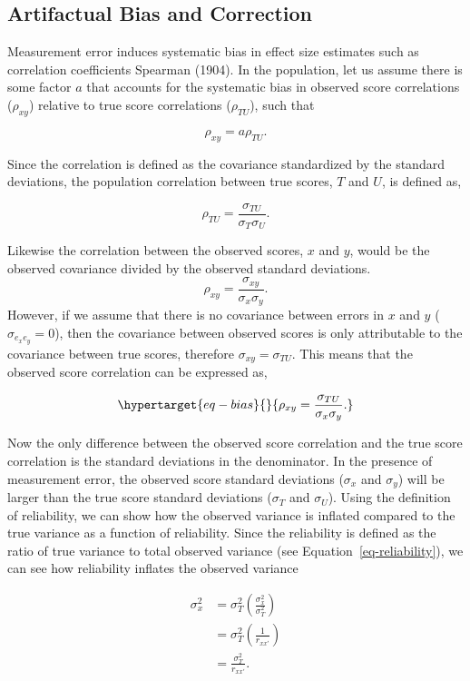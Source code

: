 \documentclass[
  letterpaper,
  DIV=11,
  numbers=noendperiod]{scrreprt}
\begin{document}
\hypertarget{sec-r-corr}{%
\subsection{Artifactual Bias and Correction}\label{sec-r-corr}}

Measurement error induces systematic bias in effect size estimates such
as correlation coefficients Spearman (1904). In the population, let us
assume there is some factor \(a\) that accounts for the systematic bias
in observed score correlations (\(\rho_{xy}\)) relative to true score
correlations (\(\rho_{TU}\)), such that

\[
\rho_{xy} = a \rho_{TU}.
\]

Since the correlation is defined as the covariance standardized by the
standard deviations, the population correlation between true scores,
\(T\) and \(U\), is defined as,

\[
\rho_{TU}=\frac{\sigma_{TU}}{\sigma_{T} \sigma_{U}}.
\]

Likewise the correlation between the observed scores, \(x\) and \(y\),
would be the observed covariance divided by the observed standard
deviations. \[
\rho_{xy} =\frac{\sigma_{xy}}{\sigma_{x} \sigma_{y}}.
\] However, if we assume that there is no covariance between errors in
\(x\) and \(y\) (\(\sigma_{e_x e_y} = 0\)), then the covariance between
observed scores is only attributable to the covariance between true
scores, therefore \(\sigma_{xy} = \sigma_{TU}\). This means that the
observed score correlation can be expressed as,

\begin{equation}\protect\hypertarget{eq-bias}{}{
\rho_{xy} =\frac{\sigma_{TU}}{\sigma_{x} \sigma_{y}}.
}\label{eq-bias}\end{equation}

Now the only difference between the observed score correlation and the
true score correlation is the standard deviations in the denominator. In
the presence of measurement error, the observed score standard
deviations (\(\sigma_x\) and \(\sigma_y\)) will be larger than the true
score standard deviations (\(\sigma_{T}\) and \(\sigma_{U}\)). Using the
definition of reliability, we can show how the observed variance is
inflated compared to the true variance as a function of reliability.
Since the reliability is defined as the ratio of true variance to total
observed variance (see Equation~\ref{eq-reliability}), we can see how
reliability inflates the observed variance

\begin{align}
\sigma^2_x &=\sigma^2_{T} \left(\frac{\sigma^2_{x}}{\sigma^2_{T}} \right)
\\ &= \sigma^2_{T}\left(\frac{1}{r_{xx'}} \right)
\\ &= \frac{\sigma^2_{T}}{r_{xx'}}.
\end{align}
\end{document}
